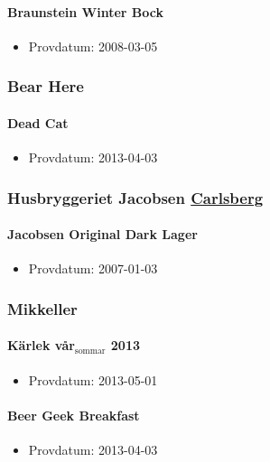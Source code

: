\documentclass[11pt]{article}
\begin{document}
\paragraph{Braunstein Winter Bock}
\label{sec:org68acb93}
\begin{itemize}
\item Provdatum: 2008-03-05
\end{itemize}
\subsubsection{Bear Here}
\label{sec:org9197f04}
\paragraph{Dead Cat}
\label{sec:orgaeab07c}
\begin{itemize}
\item Provdatum: 2013-04-03
\end{itemize}
\subsubsection{Husbryggeriet Jacobsen \underline{Carlsberg}}
\label{sec:org89b8343}
\paragraph{Jacobsen Original Dark Lager}
\label{sec:orgeec3697}
\begin{itemize}
\item Provdatum: 2007-01-03
\end{itemize}
\subsubsection{Mikkeller}
\label{sec:org3d54496}
\paragraph{Kärlek vår\(_{\text{sommar}}\) 2013}
\label{sec:orgdce46c9}
\begin{itemize}
\item Provdatum: 2013-05-01
\end{itemize}
\paragraph{Beer Geek Breakfast}
\label{sec:org7a6b8a2}
\begin{itemize}
\item Provdatum: 2013-04-03
\end{itemize}
\end{document}
